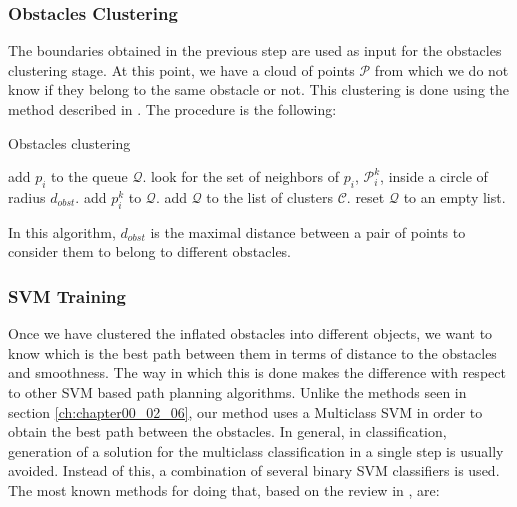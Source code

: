 \subsubsection{Obstacles Clustering}\label{ch:chapter06_01_01_02}

The boundaries obtained in the previous step are used as input for the obstacles clustering stage. At this point, we have a cloud of points $\mathcal{P}$ from which we do not know if they belong to the same obstacle or not. This clustering is done using the method described in \cite{rusu2009semantic}. The procedure is the following:

\begin{algorithm}[h!]
\caption{Obstacles clustering}
\label{alg:obstacles_clustering}
\begin{algorithmic}
  \State add $p_i$ to the queue $\mathcal{Q}$.
    \State look for the set of neighbors of $p_i$, $\mathcal{P}_i^k$, inside a circle of radius $d_{obst}$.
	\State add $p_i^k$ to $\mathcal{Q}$.
      \EndIf
    \EndFor
      \State add $\mathcal{Q}$ to the list of clusters $\mathcal{C}$.
      \State reset $\mathcal{Q}$ to an empty list.
    \EndIf
  \EndFor
\EndFor
\end{algorithmic}
\end{algorithm}

In this algorithm, $d_{obst}$ is the maximal distance between a pair of points to consider them to belong to different obstacles.

\subsubsection{\ac{SVM} Training}\label{ch:chapter06_01_01_03}

Once we have clustered the inflated obstacles into different objects, we want to know which is the best path between them in terms of distance to the obstacles and smoothness. The way in which this is done makes the difference with respect to other \ac{SVM} based path planning algorithms. Unlike the methods seen in section \ref{ch:chapter00_02_06}, our method uses a Multiclass \acs{SVM} in order to obtain the best path between the obstacles. In general, in classification, generation of a solution for the multiclass classification in a single step is usually avoided. Instead of this, a combination of several binary \ac{SVM} classifiers is used. The most known methods for doing that, based on the review in \cite{hsu2002comparison, duan2005best}, are:

